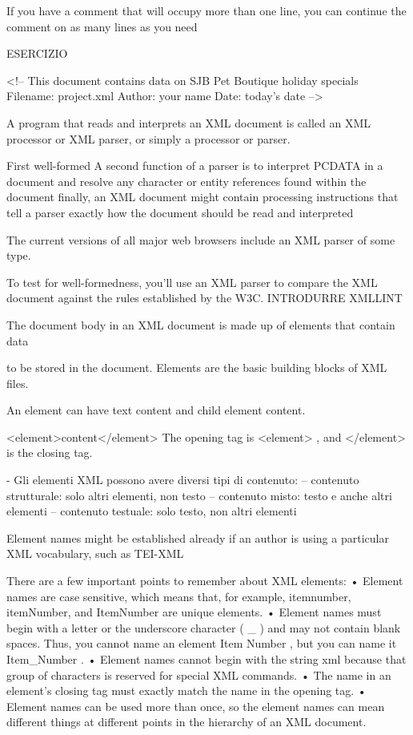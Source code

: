 If you have a comment that will occupy more than one line, you can
continue the ­comment on as many lines as you need


ESERCIZIO

<!--
This document contains data on SJB Pet Boutique
holiday specials
Filename: project.xml
Author:
your name
Date:
today's date
-->


A program that reads and interprets an XML document is called an XML processor or XML parser, or simply a processor or parser.

First well-formed
A second function of a parser is to interpret PCDATA in a document and resolve any character or
entity references found within the document
finally, an XML document might contain
processing instructions that tell a parser exactly how the document should be read and
interpreted

The current versions of all major web browsers include an XML parser of some type.

To test for well-formedness, you’ll use an XML parser to compare the XML document against the
rules established by the W3C.
INTRODURRE XMLLINT


The document body in an XML document is made up of elements that contain data

to be stored in the document. Elements are the basic building blocks of XML files.

An ­element can have text content and child element content.

<element>content</element>
The opening tag is <element> , and </element> is the closing
tag.

- Gli elementi XML possono avere diversi tipi di contenuto:
-- contenuto strutturale: solo altri elementi, non testo
-- contenuto misto: testo e anche altri elementi
-- contenuto testuale: solo testo, non altri elementi

Element names might be established already if an author is using a particular XML
vocabulary, such as TEI-XML


There are a few important points to remember about XML elements:
• Element names are case sensitive, which means that, for example, itemnumber,
itemNumber, and ItemNumber are unique elements.
• Element names must begin with a letter or the underscore character ( \_ ) and may not
contain blank spaces. Thus, you cannot name an element Item Number , but you can
name it Item\_Number .
• Element names cannot begin with the string xml because that group of ­characters is
reserved for special XML commands.
• The name in an element’s closing tag must exactly match the name in the ­opening tag.
• Element names can be used more than once, so the element names can mean
different things at different points in the hierarchy of an XML document.

